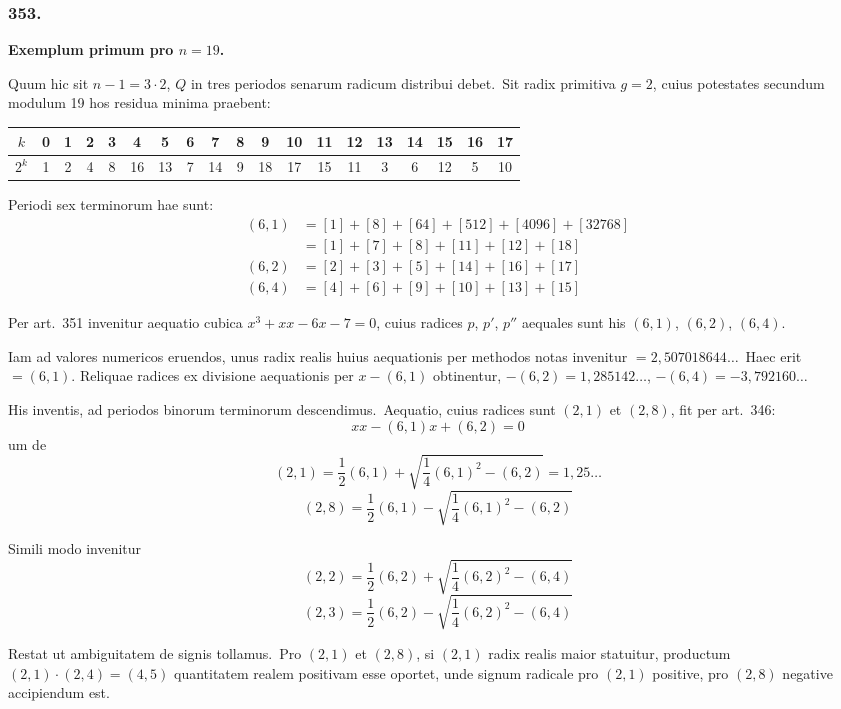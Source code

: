 \documentclass[12pt,a4paper]{article}
\theoremstyle{plain}
\theoremstyle{definition}
\theoremstyle{remark}
\begin{document}
\subsubsection*{353.}

\textbf{Exemplum primum pro $n=19$.}

Quum hic sit $n-1=3\cdot 2$, $Q$ in tres periodos senarum radicum
distribui debet.\ Sit radix primitiva $g=2$, cuius potestates secundum
modulum 19 hos residua minima praebent:

\begin{center}
\begin{tabular}{c|cccccccccccccccccc}
$k$ & 0 & 1 & 2 & 3 & 4 & 5 & 6 & 7 & 8 & 9 & 10 & 11 & 12 & 13 & 14 & 15 & 16 & 17 \\
\hline
$2^k$ & 1 & 2 & 4 & 8 & 16 & 13 & 7 & 14 & 9 & 18 & 17 & 15 & 11 & 3 & 6 & 12 & 5 & 10
\end{tabular}
\end{center}

Periodi sex terminorum hae sunt:
\begin{align*}
(6,1) &= [1]+[8]+[64]+[512]+[4096]+[32768] \\
      &= [1]+[7]+[8]+[11]+[12]+[18] \\
(6,2) &= [2]+[3]+[5]+[14]+[16]+[17] \\
(6,4) &= [4]+[6]+[9]+[10]+[13]+[15]
\end{align*}

Per art.\ 351 invenitur aequatio cubica $x^3+xx-6x-7=0$, cuius
radices $p$, $p'$, $p''$ aequales sunt his $(6,1)$, $(6,2)$, $(6,4)$.

Iam ad valores numericos eruendos, unus radix realis huius aequationis
per methodos notas invenitur $=2,507018644\dots$\ Haec erit $=(6,1)$.
Reliquae radices ex divisione aequationis per $x-(6,1)$ obtinentur,
$-(6,2)=1,285142\dots$, $-(6,4)=-3,792160\dots$

His inventis, ad periodos binorum terminorum descendimus.\ Aequatio,
cuius radices sunt $(2,1)$ et $(2,8)$, fit per art.\ 346:
\[xx-(6,1)x+(6,2)=0\]
um de
\[(2,1) = \frac{1}{2}(6,1)+\sqrt{\frac{1}{4}(6,1)^2-(6,2)} = 1,25\dots\]
\[(2,8) = \frac{1}{2}(6,1)-\sqrt{\frac{1}{4}(6,1)^2-(6,2)}\]

Simili modo invenitur
\[(2,2) = \frac{1}{2}(6,2)+\sqrt{\frac{1}{4}(6,2)^2-(6,4)}\]
\[(2,3) = \frac{1}{2}(6,2)-\sqrt{\frac{1}{4}(6,2)^2-(6,4)}\]

Restat ut ambiguitatem de signis tollamus.\ Pro $(2,1)$ et $(2,8)$,
si $(2,1)$ radix realis maior statuitur, productum $(2,1)\cdot(2,4)=(4,5)$
quantitatem realem positivam esse oportet, unde signum radicale pro
$(2,1)$ positive, pro $(2,8)$ negative accipiendum est.
\end{document}
